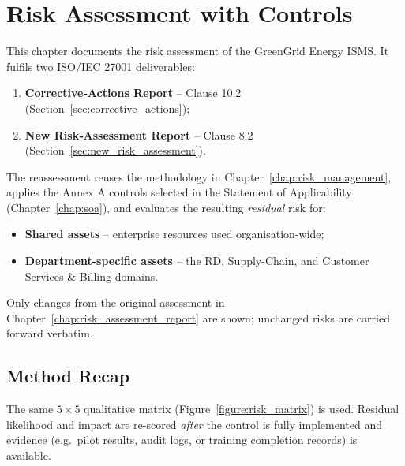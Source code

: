 \chapter{Risk Assessment with Controls}
\label{chap:activity12}

This chapter documents the risk assessment of the GreenGrid Energy \ac{ISMS}.  
It fulfils two ISO/IEC 27001 deliverables:
\begin{enumerate}
  \item \textbf{Corrective‐Actions Report} -- Clause 10.2 (Section~\ref{sec:corrective_actions});
  \item \textbf{New Risk‐Assessment Report} -- Clause 8.2 (Section~\ref{sec:new_risk_assessment}).
\end{enumerate}

The reassessment reuses the methodology in
Chapter~\ref{chap:risk_management}, applies the Annex A controls selected in
the Statement of Applicability (Chapter~\ref{chap:soa}), and evaluates the
resulting \emph{residual} risk for:
\begin{itemize}
  \item \textbf{Shared assets} -- enterprise resources used organisation-wide;
  \item \textbf{Department-specific assets} -- the \ac{RD}, Supply-Chain, and Customer Services \& Billing domains.
\end{itemize}

Only changes from the original assessment in Chapter~\ref{chap:risk_assessment_report} are shown; unchanged risks are carried forward verbatim.

\section{Method Recap}
\label{sec:method_recap}

The same $5\times5$ qualitative matrix (Figure~\ref{figure:risk_matrix}) is used.
Residual likelihood and impact are re-scored \emph{after} the control is fully
implemented and evidence (e.g.\ pilot results, audit logs, or training
completion records) is available.

